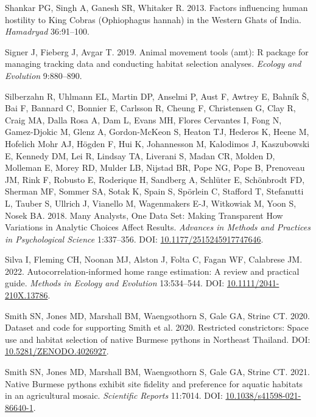 \documentclass[10pt,a4paper]{article}
\newlength{\cslhangindent}
\newenvironment{CSLReferences}[2] %
 {\begin{list}{}{%
  \setlength{\itemindent}{0pt}
  \setlength{\leftmargin}{0pt}
  \setlength{\parsep}{0pt}
  \ifodd #1
   \setlength{\leftmargin}{\cslhangindent}
   \setlength{\itemindent}{-1\cslhangindent}
  \fi
  \setlength{\itemsep}{#2\baselineskip}}}
 {\end{list}}
\begin{document}
\begin{CSLReferences}{1}{0}
Shankar PG, Singh A, Ganesh SR, Whitaker R. 2013. Factors influencing human hostility to {King} {Cobras} ({Ophiophagus} hannah) in the {Western} {Ghats} of {India}. \emph{Hamadryad} 36:91--100.

Signer J, Fieberg J, Avgar T. 2019. Animal movement tools (amt): R package for managing tracking data and conducting habitat selection analyses. \emph{Ecology and Evolution} 9:880--890.

Silberzahn R, Uhlmann EL, Martin DP, Anselmi P, Aust F, Awtrey E, Bahník Š, Bai F, Bannard C, Bonnier E, Carlsson R, Cheung F, Christensen G, Clay R, Craig MA, Dalla Rosa A, Dam L, Evans MH, Flores Cervantes I, Fong N, Gamez-Djokic M, Glenz A, Gordon-McKeon S, Heaton TJ, Hederos K, Heene M, Hofelich Mohr AJ, Högden F, Hui K, Johannesson M, Kalodimos J, Kaszubowski E, Kennedy DM, Lei R, Lindsay TA, Liverani S, Madan CR, Molden D, Molleman E, Morey RD, Mulder LB, Nijstad BR, Pope NG, Pope B, Prenoveau JM, Rink F, Robusto E, Roderique H, Sandberg A, Schlüter E, Schönbrodt FD, Sherman MF, Sommer SA, Sotak K, Spain S, Spörlein C, Stafford T, Stefanutti L, Tauber S, Ullrich J, Vianello M, Wagenmakers E-J, Witkowiak M, Yoon S, Nosek BA. 2018. Many {Analysts}, {One} {Data} {Set}: {Making} {Transparent} {How} {Variations} in {Analytic} {Choices} {Affect} {Results}. \emph{Advances in Methods and Practices in Psychological Science} 1:337--356. DOI: \href{https://doi.org/10.1177/2515245917747646}{10.1177/2515245917747646}.

Silva I, Fleming CH, Noonan MJ, Alston J, Folta C, Fagan WF, Calabrese JM. 2022. Autocorrelation‐informed home range estimation: {A} review and practical guide. \emph{Methods in Ecology and Evolution} 13:534--544. DOI: \href{https://doi.org/10.1111/2041-210X.13786}{10.1111/2041-210X.13786}.

Smith SN, Jones MD, Marshall BM, Waengsothorn S, Gale GA, Strine CT. 2020. Dataset and code for supporting {Smith} et al. 2020. {Restricted} constrictors: {Space} use and habitat selection of native {Burmese} pythons in {Northeast} {Thailand}. DOI: \href{https://doi.org/10.5281/ZENODO.4026927}{10.5281/ZENODO.4026927}.

Smith SN, Jones MD, Marshall BM, Waengsothorn S, Gale GA, Strine CT. 2021. Native {Burmese} pythons exhibit site fidelity and preference for aquatic habitats in an agricultural mosaic. \emph{Scientific Reports} 11:7014. DOI: \href{https://doi.org/10.1038/s41598-021-86640-1}{10.1038/s41598-021-86640-1}.


\end{CSLReferences}
\end{document}
